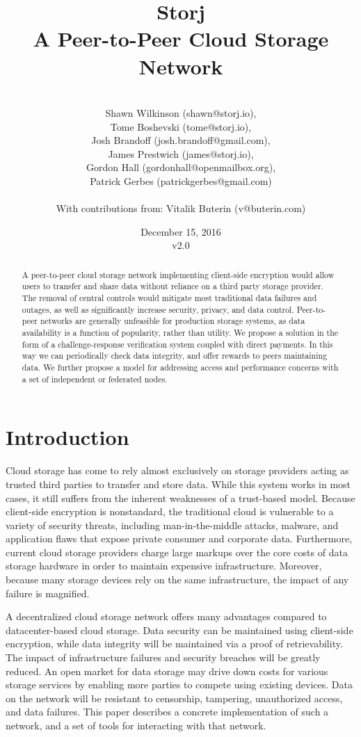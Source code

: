 \documentclass[a4paper,10pt]{article}
\title{\textbf{Storj\\A Peer-to-Peer Cloud Storage Network}}
\author{\\
Shawn Wilkinson (shawn@storj.io),\\
Tome Boshevski (tome@storj.io),\\
Josh Brandoff (josh.brandoff@gmail.com),\\
James Prestwich (james@storj.io),\\
Gordon Hall (gordonhall@openmailbox.org),\\
Patrick Gerbes (patrickgerbes@gmail.com)\\
\\
With contributions from: Vitalik Buterin (v@buterin.com)
}
\date {December 15, 2016 \\ v2.0}
\begin{document}
\maketitle
\begin{abstract}
A peer-to-peer cloud storage network implementing client-side encryption would allow users to transfer and share data without reliance on a third party storage provider. The removal of central controls would mitigate most traditional data failures and outages, as well as significantly increase security, privacy, and data control. Peer-to-peer networks are generally unfeasible for production storage systems, as data availability is a function of popularity, rather than utility. We propose a solution in the form of a challenge-response verification system coupled with direct payments. In this way we can periodically check data integrity, and offer rewards to peers maintaining data. We further propose a model for addressing access and performance concerns with a set of independent or federated nodes.
\end{abstract}


\section{Introduction}
Cloud storage has come to rely almost exclusively on storage providers acting as trusted third parties to transfer and store data. While this system works in most cases, it still suffers from the inherent weaknesses of a trust-based model. Because client-side encryption is nonstandard, the traditional cloud is vulnerable to a variety of security threats, including man-in-the-middle attacks, malware, and application flaws that expose private consumer and corporate data. Furthermore, current cloud storage providers charge large markups over the core costs of data storage hardware in order to maintain expensive infrastructure. Moreover, because many storage devices rely on the same infrastructure, the impact of any failure is magnified.

A decentralized cloud storage network offers many advantages compared to datacenter-based cloud storage. Data security can be maintained using client-side encryption, while data integrity will be maintained via a proof of retrievability. The impact of infrastructure failures and security breaches will be greatly reduced. An open market for data storage may drive down costs for various storage services by enabling more parties to compete using existing devices. Data on the network will be resistant to censorship, tampering, unauthorized access, and data failures. This paper describes a concrete implementation of such a network, and a set of tools for interacting with that network.
\end{document}

